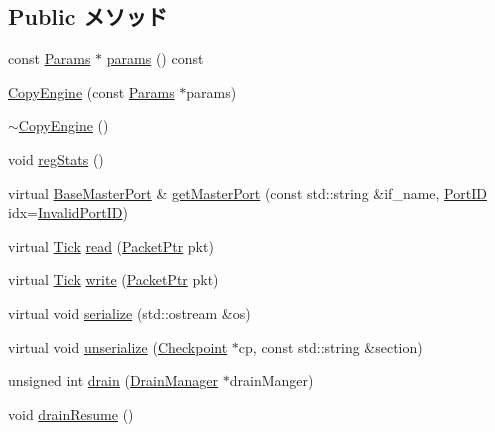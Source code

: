 \subsection*{Public メソッド}
\begin{DoxyCompactItemize}
\item 
const \hyperlink{classCopyEngine_a0b0580d58d6a0384646682653aefb97a}{Params} $\ast$ \hyperlink{classCopyEngine_acd3c3feb78ae7a8f88fe0f110a718dff}{params} () const 
\item 
\hyperlink{classCopyEngine_a7042a20ebc60002d8be8c1dd2cc77d24}{CopyEngine} (const \hyperlink{classCopyEngine_a0b0580d58d6a0384646682653aefb97a}{Params} $\ast$params)
\item 
\hyperlink{classCopyEngine_a1e9353806b1e8062eac347916ca32ac7}{$\sim$CopyEngine} ()
\item 
void \hyperlink{classCopyEngine_a4dc637449366fcdfc4e764cdf12d9b11}{regStats} ()
\item 
virtual \hyperlink{classBaseMasterPort}{BaseMasterPort} \& \hyperlink{classCopyEngine_adc4e675e51defbdd1e354dac729d0703}{getMasterPort} (const std::string \&if\_\-name, \hyperlink{base_2types_8hh_acef4d7d41cb21fdc252e20c04cd7bb8e}{PortID} idx=\hyperlink{base_2types_8hh_a65bf40f138cf863f0c5e2d8ca1144126}{InvalidPortID})
\item 
virtual \hyperlink{base_2types_8hh_a5c8ed81b7d238c9083e1037ba6d61643}{Tick} \hyperlink{classCopyEngine_a613ec7d5e1ec64f8d21fec78ae8e568e}{read} (\hyperlink{classPacket}{PacketPtr} pkt)
\item 
virtual \hyperlink{base_2types_8hh_a5c8ed81b7d238c9083e1037ba6d61643}{Tick} \hyperlink{classCopyEngine_a4cefab464e72b5dd42c003a0a4341802}{write} (\hyperlink{classPacket}{PacketPtr} pkt)
\item 
virtual void \hyperlink{classCopyEngine_a53e036786d17361be4c7320d39c99b84}{serialize} (std::ostream \&os)
\item 
virtual void \hyperlink{classCopyEngine_af22e5d6d660b97db37003ac61ac4ee49}{unserialize} (\hyperlink{classCheckpoint}{Checkpoint} $\ast$cp, const std::string \&section)
\item 
unsigned int \hyperlink{classCopyEngine_a6bf479c521c7c3eb473822d953275b26}{drain} (\hyperlink{classDrainManager}{DrainManager} $\ast$drainManger)
\item 
void \hyperlink{classCopyEngine_a8f020d3237536fe007fc488c4125c5d8}{drainResume} ()
\end{DoxyCompactItemize}
